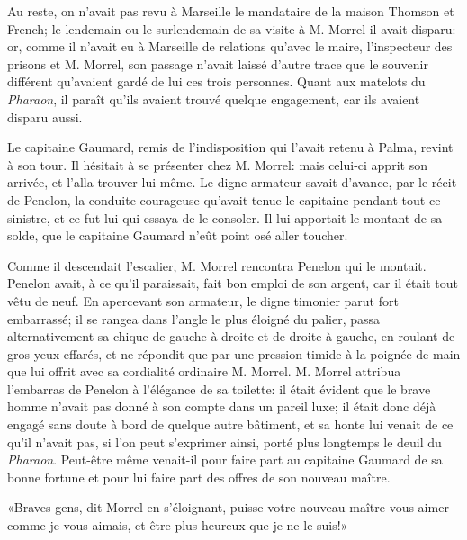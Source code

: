Au reste, on n'avait pas revu à Marseille le mandataire de la maison Thomson et French; le lendemain ou le surlendemain de sa visite à M. Morrel il avait disparu: or, comme il n'avait eu à Marseille de relations qu'avec le maire, l'inspecteur des prisons et M. Morrel, son passage n'avait laissé d'autre trace que le souvenir différent qu'avaient gardé de lui ces trois personnes. Quant aux matelots du \textit{Pharaon}, il paraît qu'ils avaient trouvé quelque engagement, car ils avaient disparu aussi.

Le capitaine Gaumard, remis de l'indisposition qui l'avait retenu à Palma, revint à son tour. Il hésitait à se présenter chez M. Morrel: mais celui-ci apprit son arrivée, et l'alla trouver lui-même. Le digne armateur savait d'avance, par le récit de Penelon, la conduite courageuse qu'avait tenue le capitaine pendant tout ce sinistre, et ce fut lui qui essaya de le consoler. Il lui apportait le montant de sa solde, que le capitaine Gaumard n'eût point osé aller toucher.

Comme il descendait l'escalier, M. Morrel rencontra Penelon qui le montait. Penelon avait, à ce qu'il paraissait, fait bon emploi de son argent, car il était tout vêtu de neuf. En apercevant son armateur, le digne timonier parut fort embarrassé; il se rangea dans l'angle le plus éloigné du palier, passa alternativement sa chique de gauche à droite et de droite à gauche, en roulant de gros yeux effarés, et ne répondit que par une pression timide à la poignée de main que lui offrit avec sa cordialité ordinaire M. Morrel. M. Morrel attribua l'embarras de Penelon à l'élégance de sa toilette: il était évident que le brave homme n'avait pas donné à son compte dans un pareil luxe; il était donc déjà engagé sans doute à bord de quelque autre bâtiment, et sa honte lui venait de ce qu'il n'avait pas, si l'on peut s'exprimer ainsi, porté plus longtemps le deuil du \textit{Pharaon}. Peut-être même venait-il pour faire part au capitaine Gaumard de sa bonne fortune et pour lui faire part des offres de son nouveau maître.

«Braves gens, dit Morrel en s'éloignant, puisse votre nouveau maître vous aimer comme je vous aimais, et être plus heureux que je ne le suis!»

